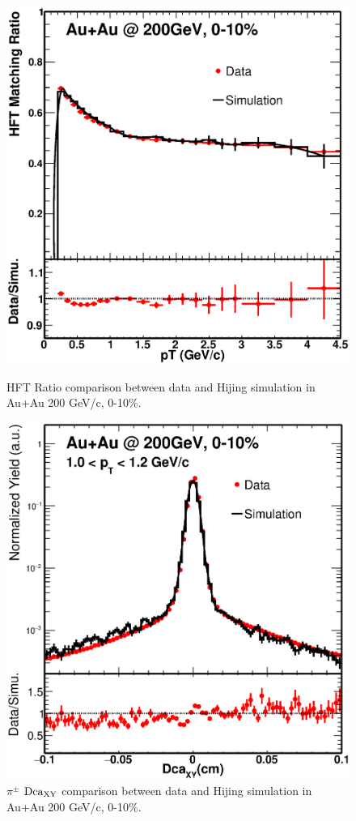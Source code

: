\documentclass[a4paper]{article}
\begin{document}
\begin{figure}[htbp]
\begin{minipage}[htbp]{0.52\linewidth}
\centering
\includegraphics[width=1.0\textwidth,angle=0]{fig/HijingRatio.eps}
\caption{ HFT Ratio comparison between data and Hijing simulation in Au+Au 200 GeV/c, 0-10\%.\label{HijingRatio}}
\end{minipage}
\hfill
\begin{minipage}[htbp]{0.52\linewidth}
\centering
\includegraphics[width=1.0\textwidth,angle=0]{fig/HijingDca.eps} 
\caption{ $\pi^{\pm}$ $\textup{Dca}_{\textup{XY}}$ comparison between data and Hijing simulation in Au+Au 200 GeV/c, 0-10\%.\label{HijingDca}}
\end{minipage}
\end{figure}
\end{document}
